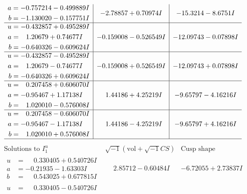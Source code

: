 \documentclass[1p]{elsarticle_modified}
\theoremstyle{definition}
\newcommand{\I}{\sqrt{-1}}
\begin{document}
$$\begin{array}{c|c|c}
\begin{aligned}
a &= -0.757214 - 0.499889 I \\
b &= -1.130020 - 0.157751 I\end{aligned}
 & -2.78857 + 0.70974 I & -15.3214 - 8.6751 I \\ \hline\begin{aligned}
u &= -0.432857 + 0.495289 I \\
a &= \phantom{-}1.20679 + 0.74677 I \\
b &= -0.640326 - 0.609624 I\end{aligned}
 & -0.159008 - 0.526549 I & -12.09743 - 0.07898 I \\ \hline\begin{aligned}
u &= -0.432857 - 0.495289 I \\
a &= \phantom{-}1.20679 - 0.74677 I \\
b &= -0.640326 + 0.609624 I\end{aligned}
 & -0.159008 + 0.526549 I & -12.09743 + 0.07898 I \\ \hline\begin{aligned}
u &= \phantom{-}0.207458 + 0.606070 I \\
a &= -0.95467 + 1.17138 I \\
b &= \phantom{-}1.020010 - 0.576008 I\end{aligned}
 & \phantom{-}1.44186 + 4.25219 I & -9.65797 - 4.16216 I \\ \hline\begin{aligned}
u &= \phantom{-}0.207458 - 0.606070 I \\
a &= -0.95467 - 1.17138 I \\
b &= \phantom{-}1.020010 + 0.576008 I\end{aligned}
 & \phantom{-}1.44186 - 4.25219 I & -9.65797 + 4.16216 I\\
 \hline 
 \end{array}$$\newpage$$\begin{array}{c|c|c}  
\text{Solutions to }I^u_{1}& \I (\text{vol} + \sqrt{-1}CS) & \text{Cusp shape}\\
 \hline 
\begin{aligned}
u &= \phantom{-}0.330405 + 0.540726 I \\
a &= -0.21935 - 1.63303 I \\
b &= \phantom{-}0.543025 + 0.677815 I\end{aligned}
 & \phantom{-}2.85712 - 0.60484 I & -6.72055 + 2.73837 I \\ \hline\begin{aligned}
u &= \phantom{-}0.330405 - 0.540726 I \\

\end{aligned}
\end{array}$$
\end{document}
